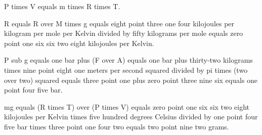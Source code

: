 P times V equals m times R times T.  

R equals R over M times g equals eight point three one four kilojoules per kilogram per mole per Kelvin divided by fifty kilograms per mole equals zero point one six six two eight kilojoules per Kelvin.  

P sub g equals one bar plus (F over A) equals one bar plus thirty-two kilograms times nine point eight one meters per second squared divided by pi times (two over two) squared equals three point one plus zero point three nine six equals one point four five bar.  

mg equals (R times T) over (P times V) equals zero point one six six two eight kilojoules per Kelvin times five hundred degrees Celsius divided by one point four five bar times three point one four two equals two point nine two grams.